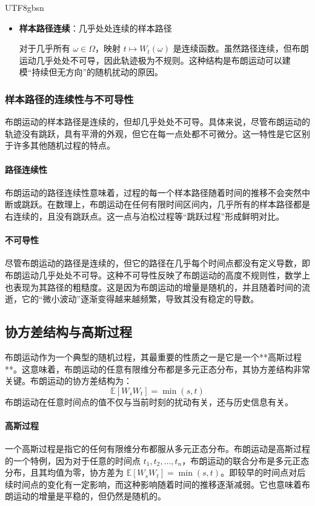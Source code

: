 \documentclass{article}
\begin{document}
\begin{CJK*}{UTF8}{gbsn}
\begin{itemize}
    \item \textbf{样本路径连续}：几乎处处连续的样本路径

    对于几乎所有 $\omega \in \Omega$，映射 $t \mapsto W_t(\omega)$ 是连续函数。虽然路径连续，但布朗运动几乎处处不可导，因此轨迹极为不规则。这种结构是布朗运动可以建模“持续但无方向”的随机扰动的原因。

\end{itemize}

\subsubsection{样本路径的连续性与不可导性}

布朗运动的样本路径是连续的，但却几乎处处不可导。具体来说，尽管布朗运动的轨迹没有跳跃，具有平滑的外观，但它在每一点处都不可微分。这一特性是它区别于许多其他随机过程的特点。

\paragraph{路径连续性}
布朗运动的路径连续性意味着，过程的每一个样本路径随着时间的推移不会突然中断或跳跃。在数理上，布朗运动在任何有限时间区间内，几乎所有的样本路径都是右连续的，且没有跳跃点。这一点与泊松过程等“跳跃过程”形成鲜明对比。

\paragraph{不可导性}
尽管布朗运动的路径是连续的，但它的路径在几乎每个时间点都没有定义导数，即布朗运动几乎处处不可导。这种不可导性反映了布朗运动的高度不规则性，数学上也表现为其路径的粗糙度。这是因为布朗运动的增量是随机的，并且随着时间的流逝，它的“微小波动”逐渐变得越来越频繁，导致其没有稳定的导数。

\subsection{协方差结构与高斯过程}

布朗运动作为一个典型的随机过程，其最重要的性质之一是它是一个**高斯过程**。这意味着，布朗运动的任意有限维分布都是多元正态分布，其协方差结构非常关键。布朗运动的协方差结构为：
\[
\mathbb{E}[W_s W_t] = \min(s, t)
\]
布朗运动在任意时间点的值不仅与当前时刻的扰动有关，还与历史信息有关。

\paragraph{高斯过程}
一个高斯过程是指它的任何有限维分布都服从多元正态分布。布朗运动是高斯过程的一个特例，因为对于任意的时间点 $t_1, t_2, \dots, t_n$，布朗运动的联合分布是多元正态分布，且其均值为零，协方差为 $\mathbb{E}[W_s W_t] = \min(s, t)$。即较早的时间点对后续时间点的变化有一定影响，而这种影响随着时间的推移逐渐减弱。它也意味着布朗运动的增量是平稳的，但仍然是随机的。


\end{CJK*}
\end{document}
